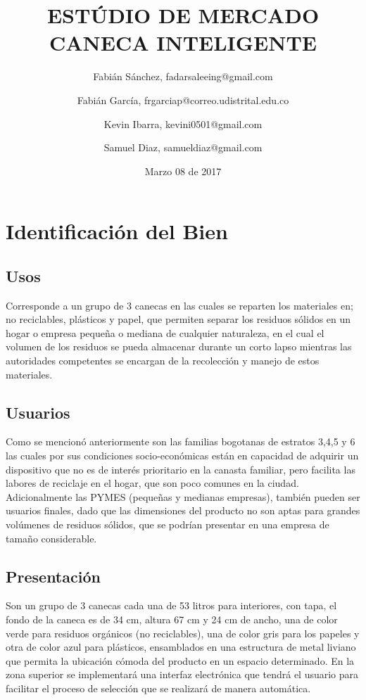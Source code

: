 \documentclass{report}
\title{ESTÚDIO DE MERCADO CANECA INTELIGENTE}
\author{Fabián Sánchez, fadarsaleeing@gmail.com \and Fabián García, frgarciap@correo.udistrital.edu.co \and Kevin Ibarra, kevini0501@gmail.com \and Samuel Diaz, samueldiaz@gmail.com}
\date{Marzo 08 de 2017}
\begin{document}
\maketitle


 \tableofcontents



\chapter{Identificación del Bien}

    \section{Usos}
    Corresponde a un grupo de 3 canecas en las cuales se reparten los materiales en; no reciclables, plásticos y papel, que permiten separar los residuos sólidos en un hogar o empresa pequeña o mediana de cualquier naturaleza, en el cual el volumen de los residuos se pueda almacenar durante un corto lapso mientras las autoridades competentes se encargan de la recolección y manejo de estos materiales.

    \section{Usuarios}
    Como se mencionó anteriormente son las familias bogotanas de estratos 3,4,5 y 6 las cuales por sus condiciones socio-económicas están en capacidad de adquirir un dispositivo que no es de interés prioritario en la canasta familiar, pero facilita las labores de reciclaje en el hogar, que son poco comunes en la ciudad. Adicionalmente las PYMES (pequeñas y medianas empresas), también pueden ser usuarios finales, dado que las dimensiones del producto no son aptas para grandes volúmenes de residuos sólidos, que se podrían presentar en una empresa de tamaño considerable.

    \section{Presentación}
    Son un grupo de 3 canecas cada una de 53 litros para interiores, con tapa, el fondo de la caneca es de 34 cm, altura 67 cm y 24 cm de ancho, una de color verde para residuos orgánicos (no reciclables), una de color gris para los papeles y otra de color azul para plásticos, ensamblados en una estructura de metal liviano que permita la ubicación cómoda del producto en un espacio determinado. En la zona superior se implementará una interfaz electrónica que tendrá el usuario para facilitar el proceso de selección que se realizará de manera automática.
\end{document}

